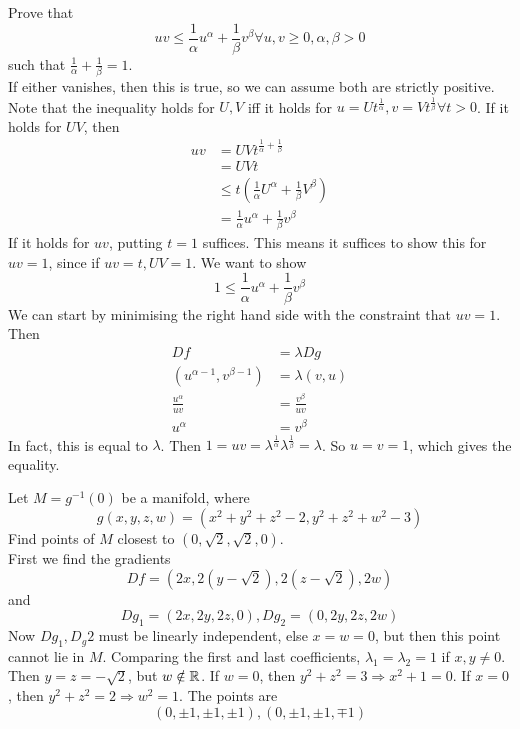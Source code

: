 \documentclass[12pt]{article}
\begin{document}
\begin{ex}
    Prove that
    $$uv \leq \frac{1}{\alpha} u^\alpha + \frac{1}{\beta} v^\beta \forall u,v \geq 0, \alpha,\beta > 0$$
    such that $\frac{1}{\alpha} + \frac{1}{\beta} = 1$. \\
If either vanishes, then this is true, so we can assume both are strictly positive. Note that the inequality holds for $U,V$ iff it holds for $u = Ut^{\frac{1}{\alpha}}, v = Vt^{\frac{1}{\beta}} \forall t > 0$. If it holds for $UV$, then
    \begin{align*}
        uv &= UVt^{\frac{1}{\alpha} + \frac{1}{\beta}} \\
           &= UVt \\
           &\leq t\left(\frac{1}{\alpha}U^\alpha + \frac{1}{\beta}V^\beta\right) \\
           &= \frac{1}{\alpha} u^\alpha + \frac{1}{\beta} v^\beta
    \end{align*}
    If it holds for $uv$, putting $t=1$ suffices. This means it suffices to show this for $uv = 1$, since if $uv = t, UV = 1$. We want to show
    $$1 \leq \frac{1}{\alpha} u^\alpha + \frac{1}{\beta} v^\beta$$
    We can start by minimising the right hand side with the constraint that $uv = 1$. Then
    \begin{align*}
        Df &= \lambda Dg \\
        (u^{\alpha-1}, v^{\beta-1}) &= \lambda(v, u) \\
        \frac{u^\alpha}{uv} &= \frac{v^\beta}{uv} \\
        u^\alpha &= v^\beta
    \end{align*}
    In fact, this is equal to $\lambda$. Then $1 = uv = \lambda^{\frac{1}{\alpha}}\lambda^{\frac{1}{\beta}} = \lambda$. So $u = v = 1$, which gives the equality.
\end{ex}

\begin{ex}
    Let $M = g^{-1}(0)$ be a manifold, where
    $$g(x,y,z,w) = (x^2 + y^2 + z^2 - 2, y^2 + z^2 + w^2 - 3)$$
    Find points of $M$ closest to $(0,\sqrt 2,\sqrt 2,0)$. \\
    First we find the gradients
    $$Df = (2x, 2(y-\sqrt{2}), 2(z-\sqrt{2}),2w)$$
    and
    $$Dg_1 = (2x,2y,2z,0), Dg_2 = (0,2y,2z,2w)$$
    Now $Dg_1,D_g2$ must be linearly independent, else $x = w = 0$, but then this point cannot lie in $M$. Comparing the first and last coefficients, $\lambda_1 = \lambda_2 = 1$ if $x, y \neq 0$. Then $y = z = -\sqrt 2$, but $w \notin \mathbb{R}$. If $w = 0$, then $y^2 + z^2 = 3 \Rightarrow x^2 + 1 = 0$. If $x = 0$, then $y^2 + z^2 = 2 \Rightarrow w^2 = 1$. The points are
    $$(0, \pm 1, \pm 1, \pm 1), (0, \pm 1, \pm 1, \mp 1)$$
\end{ex}
\end{document}
